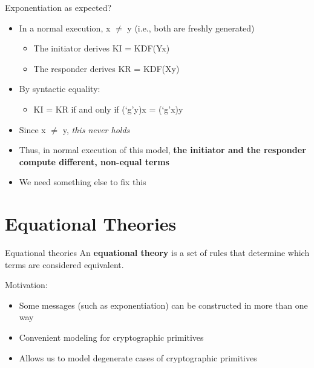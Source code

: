 \documentclass[11pt,aspectratio=169]{beamer}
\begin{document}
\begin{frame}[fragile]{Exponentiation as expected?}
    \begin{itemize}
        \item In a normal execution, \textcolor{TermBlue}{x $\neq$ y}
              (i.e., both are freshly generated)
        \begin{itemize}
            \item The initiator derives \textcolor{TermBlue}{KI = KDF(Y\pow{}x)}
            \item The responder derives \textcolor{TermBlue}{KR = KDF(X\pow{}y)}
        \end{itemize}
        \item By syntactic equality:
        \begin{itemize}
            \item \textcolor{TermBlue}{KI = KR} if and only if
            \textcolor{TermBlue}{(`g'\pow{}y)\pow{}x = (`g'\pow{}x)\pow{}y}
        \end{itemize}
        \item Since \textcolor{TermBlue}{x $\neq$ y}, \textit{this never holds}
        \item Thus, in normal execution of this model, \textbf{the initiator 
              and the responder compute different, non-equal terms}
        \item We need something else to fix this
    \end{itemize}
\end{frame}


\section{Equational Theories}


\begin{frame}[fragile]{Equational theories}
    An \textbf{equational theory} is a set of rules that determine which terms 
    are considered equivalent.

    Motivation:
    \begin{itemize}
        \item Some messages (such as exponentiation) can be constructed in more 
              than one way
        \item Convenient modeling for cryptographic primitives
        \item Allows us to model degenerate cases of cryptographic primitives
    \end{itemize}
\end{frame}
\end{document}
